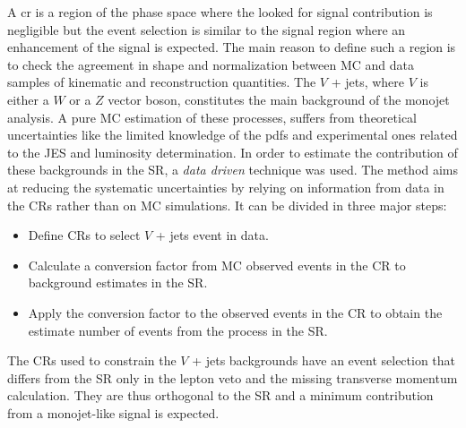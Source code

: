 A \gls{cr} is a region of the phase space where the looked for signal
contribution is negligible but the event selection is similar to the signal
region where an enhancement of the signal is expected. The main reason to define
such a region is to check the agreement in shape and normalization between MC
and data samples of kinematic and reconstruction quantities. The $V$ + jets,
where $V$ is either a $W$ or a $Z$ vector boson, constitutes the main background
of the monojet analysis. A pure MC estimation of these processes, suffers from
theoretical uncertainties like the limited knowledge of the \glspl{pdf} and
experimental ones related to the JES and luminosity determination. In order to
estimate the contribution of these backgrounds in the SR, a \emph{data driven}
technique was used. The method aims at reducing the systematic uncertainties by
relying on information from data in the CRs rather than on MC simulations. It
can be divided in three major steps:
\begin{itemize}
\item Define CRs to select $V$ + jets event in data.
\item Calculate a conversion factor from MC observed events in the CR to
  background estimates in the SR\@.
\item Apply the conversion factor to the observed events in the CR to obtain the
  estimate number of events from the process in the SR\@.
\end{itemize}
The CRs used to constrain the $V$ + jets backgrounds have an event selection
that differs from the SR only in the lepton veto and the missing transverse
momentum calculation. They are thus orthogonal to the SR and a minimum
contribution from a monojet-like signal is expected.
